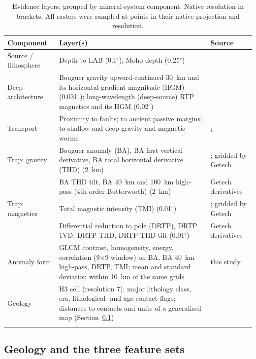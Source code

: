 \documentclass[pdflatex,sn-apa]{sn-jnl}
\begin{document}
\begin{table}[t]
\caption{Evidence layers, grouped by mineral-system component. Native resolution in brackets. All rasters were sampled at points in their native projection and resolution.}\label{tab:layers}
\footnotesize
\begin{tabular*}{\textwidth}{@{\extracolsep\fill}p{2.3cm}p{6.0cm}p{3.2cm}}
\toprule
Component & Layer(s) & Source \\
\midrule
Source / lithosphere & Depth to LAB (0.1$^\circ$); Moho depth (0.25$^\circ$) & \citet{McCafferty2023} \\
Deep architecture & Bouguer gravity upward-continued 30~km and its horizontal-gradient magnitude (HGM) (0.031$^\circ$); long-wavelength (deep-source) RTP magnetics and its HGM (0.02$^\circ$) & \citet{McCafferty2023} \\
Transport & Proximity to faults; to ancient passive margins; to shallow and deep gravity and magnetic worms & \citet{McCafferty2023}; \citet{BradleyDC2008} \\
Trap: gravity & Bouguer anomaly (BA), BA first vertical derivative, BA total horizontal derivative (THD) (2~km) & \citet{Jobin2017}; gridded by Getech \\
 & BA THD tilt, BA 40~km and 100~km high-pass (4th-order Butterworth) (2~km) & Getech derivatives \\
Trap: magnetics & Total magnetic intensity (TMI) (0.01$^\circ$) & \citet{Miles2016}; gridded by Getech \\
 & Differential reduction to pole (DRTP), DRTP 1VD, DRTP THD, DRTP THD tilt (0.01$^\circ$) & Getech derivatives \\
Anomaly form & GLCM contrast, homogeneity, energy, correlation (9$\times$9 window) on BA, BA 40~km high-pass, DRTP, TMI; mean and standard deviation within 10~km of the same grids & this study \\
Geology & H3 cell (resolution 7): major lithology class, era, lithological- and age-contact flags; distances to contacts and units of a generalised map (Section~\ref{sec:featuresets}) & \citet{Wheeler1996} \\
\botrule
\end{tabular*}
\end{table}

\subsection{Geology and the three feature sets}\label{sec:featuresets}
\end{document}
